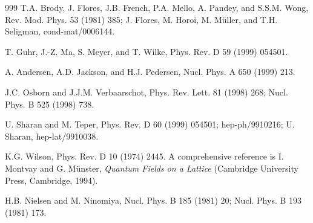 \begin{thebibliography}{999}
 T.A. Brody, J. Flores, J.B. French,
                      P.A. Mello, A. Pandey, and S.S.M. Wong, 
                      Rev. Mod. Phys. 53 (1981) 385; 
                      J. Flores, M. Horoi, M. M\"uller, and
                      T.H. Seligman, 
                      cond-mat/0006144.   %

      T. Guhr, J.-Z. Ma, S. Meyer, and T. Wilke,
                      Phys. Rev. D 59 (1999) 054501.         %

      A. Andersen, A.D. Jackson, and H.J. Pedersen,
                      Nucl. Phys. A 650 (1999) 213.

                      J.C. Osborn and J.J.M. Verbaarschot,
                      Phys. Rev. Lett. 81 (1998) 268;            %
                      Nucl. Phys. B 525 (1998) 738.              %

      U. Sharan and M. Teper,
                      Phys. Rev. D 60 (1999) 054501;             %
                      hep-ph/9910216;                            %
                      U. Sharan,
                      hep-lat/9910038.                           %

      K.G. Wilson, 
                      Phys. Rev. D 10 (1974) 2445.           %
                      A comprehensive reference is 
                      I. Montvay and G. M\"unster, 
                      {\em Quantum Fields on a Lattice\/} 
                      (Cambridge University Press, Cambridge, 1994).  %

      H.B. Nielsen and M. Ninomiya, 
                      Nucl. Phys. B 185 (1981) 20;           %
                      Nucl. Phys. B 193 (1981) 173.          %


\end{thebibliography}
